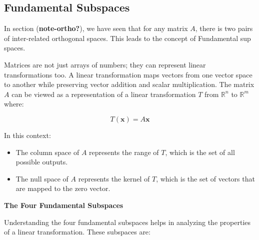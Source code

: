 \documentclass[
  letterpaper,
  DIV=11,
  numbers=noendperiod]{scrreprt}
\providecommand{\tightlist}{%
  \setlength{\itemsep}{0pt}\setlength{\parskip}{0pt}}\usepackage{longtable,booktabs,array}
\theoremstyle{plain}
\theoremstyle{definition}
\theoremstyle{remark}
\begin{document}
\subsection{Fundamental Subspaces}\label{fundamental-subspaces}

In section (\textbf{note-ortho?}), we have seen that for any matrix
\(A\), there is two pairs of inter-related orthogonal spaces. This leads
to the concept of Fundamental sup spaces.

Matrices are not just arrays of numbers; they can represent linear
transformations too. A linear transformation maps vectors from one
vector space to another while preserving vector addition and scalar
multiplication. The matrix \(A\) can be viewed as a representation of a
linear transformation \(T\) from \(\mathbb{R}^n\) to \(\mathbb{R}^m\)
where:

\[T(\mathbf{x}) = A \mathbf{x}\]

In this context:

\begin{itemize}
\tightlist
\item
  The column space of \(A\) represents the range of \(T\), which is the
  set of all possible outputs.
\item
  The null space of \(A\) represents the kernel of \(T\), which is the
  set of vectors that are mapped to the zero vector.
\end{itemize}

\textbf{The Four Fundamental Subspaces}

Understanding the four fundamental subspaces helps in analyzing the
properties of a linear transformation. These subspaces are:
\end{document}
